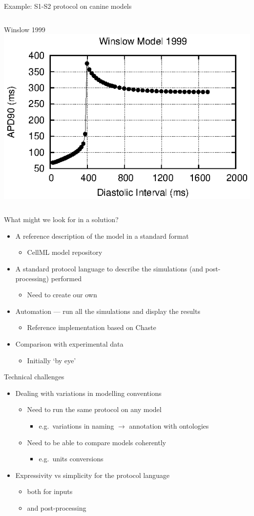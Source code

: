 \documentclass[t,xcolor={usenames,dvipsnames}]{beamer}
\newcommand{\subitem}[1]{\begin{itemize}\item #1 \end{itemize}}
\newcommand{\ghead}[1]{{\tiny #1\\}}
\begin{document}
\begin{frame}{Example: S1-S2 protocol on canine models}
\begin{columns}[T]
\begin{column}{.33\linewidth}
\begin{center}
{\ghead{Winslow 1999}\includegraphics[width=\textwidth]{winslow_model_1999_s1s2_curve}}
\end{center}
\end{column}
\end{columns}\end{frame}

\begin{frame}{What might we look for in a solution?}
\begin{itemize}[<+->]
\item A \alert{reference description} of the model in a standard format
  \subitem{CellML model repository}
\item A standard \alert{protocol language} to describe the simulations (and post-processing) performed
  \subitem{Need to create our own}
\item \alert{Automation} --- run all the simulations and display the results
  \subitem{Reference implementation based on Chaste}
\item Comparison with \alert{experimental data}
  \subitem{Initially `by eye'}
\end{itemize}
\end{frame}

\begin{frame}{Technical challenges}
\begin{itemize}
\item Dealing with variations in modelling conventions
  \begin{itemize}
  \item Need to run the same protocol on any model
    \subitem{e.g.\ variations in naming $\rightarrow$ annotation with \alert{ontologies}}
  \item Need to be able to compare models coherently
    \subitem{e.g.\ units conversions}
  \end{itemize}
\item Expressivity vs simplicity for the protocol language
  \begin{itemize}
  \item both for inputs
  \item and post-processing
  \end{itemize}
\end{itemize}
\end{frame}
\end{document}
